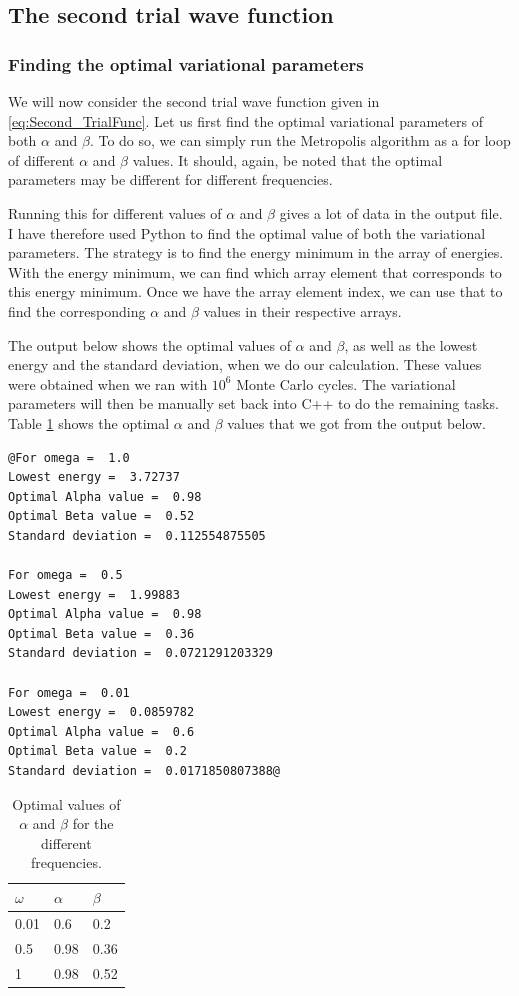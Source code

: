 \documentclass[12pt]{article}
\begin{document}
  
\FloatBarrier
\subsection{The second trial wave function}
\subsubsection{Finding the optimal variational parameters}
We will now consider the second trial wave function given in  \ref{eq:Second_TrialFunc}. Let us first find the optimal variational parameters of both $\alpha$ and $\beta$. To do so, we can simply run the Metropolis algorithm as a for loop of different $\alpha$ and $\beta$ values. It should, again, be noted that the optimal parameters may be different for different frequencies.

Running this for different values of $\alpha$ and $\beta$ gives a lot of data in the output file. I have therefore used Python to find the optimal value of both the variational parameters. The strategy is to find the energy minimum in the array of energies. With the energy minimum, we can find which array element that corresponds to this energy minimum. Once we have the array element index, we can use that to find the corresponding $\alpha$ and $\beta$ values in their respective arrays.

The output below shows the optimal values of $\alpha$ and $\beta$, as well as the lowest energy and the standard deviation, when we do our calculation. These values were obtained when we ran with $10^6$ Monte Carlo cycles. The variational parameters will then be manually set back into C++ to do the remaining tasks. Table \ref{table:Optimal_AlphaBeta} shows the optimal $\alpha$ and $\beta$ values that we got from the output below.
\begin{lstlisting}
@For omega =  1.0
Lowest energy =  3.72737
Optimal Alpha value =  0.98
Optimal Beta value =  0.52
Standard deviation =  0.112554875505

For omega =  0.5
Lowest energy =  1.99883
Optimal Alpha value =  0.98
Optimal Beta value =  0.36
Standard deviation =  0.0721291203329

For omega =  0.01
Lowest energy =  0.0859782
Optimal Alpha value =  0.6
Optimal Beta value =  0.2
Standard deviation =  0.0171850807388@
\end{lstlisting}

\begin{table}
\begin{center}
	\begin{tabular}{| l | l | l |}
	\hline
	 $\omega$ & $\alpha$ & $\beta$ \\ \hline
	 0.01 & 0.6 & 0.2 \\
	 0.5 & 0.98 & 0.36 \\
	 1 & 0.98 & 0.52 \\ \hline
	\end{tabular}
\caption{Optimal values of $\alpha$ and $\beta$ for the different frequencies.}
\label{table:Optimal_AlphaBeta}
\end{center}
\end{table}
\end{document}
